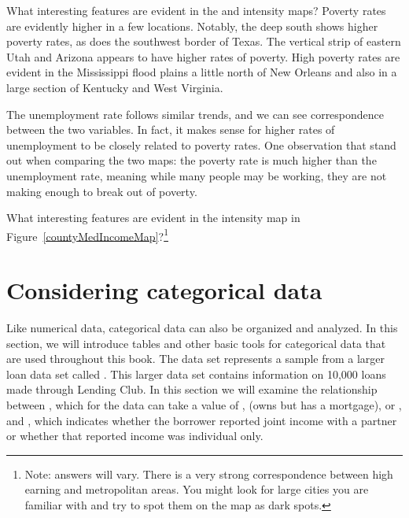 \begin{example}{What interesting features are evident in the
     and 
    intensity maps?}
  Poverty rates are evidently higher in a few locations.
  Notably, the deep south shows higher poverty rates,
  as does the southwest border of Texas.
  The vertical strip of eastern Utah and Arizona
  appears to have higher rates of poverty.
  High poverty rates are evident in the Mississippi
  flood plains a little north of New Orleans and
  also in a large section of Kentucky and West Virginia.

  The unemployment rate follows similar trends,
  and we can see correspondence between the two
  variables. In fact, it makes sense for higher rates
  of unemployment to be closely related to poverty rates.
  One observation that stand out when comparing the two maps:
  the poverty rate is much higher than the unemployment
  rate, meaning while many people may be working,
  they are not making enough to break out of poverty.
\end{example}

\begin{exercise}
What interesting features are evident in the  intensity map in Figure~\ref{countyMedIncomeMap}?\footnote{Note: answers will vary. There is a very strong correspondence between high earning and metropolitan areas. You might look for large cities you are familiar with and try to spot them on the map as dark spots.}
\end{exercise}




\section[Considering categorical data]{Considering categorical data ~}
\label{categoricalData}


Like numerical data, categorical data can also be organized
and analyzed.
In this section, we will introduce tables and other basic tools
for categorical data that are used throughout this book.
The  data set represents a sample from a larger
loan data set called .
This larger data set contains information on 10,000 loans made
through Lending Club.
In this section we will examine the relationship between
, which for the  data can take
a value of , 
(owns but has a mortgage), or ,
and ,
which indicates whether the borrower reported joint income
with a partner or whether that reported income was
individual only.


